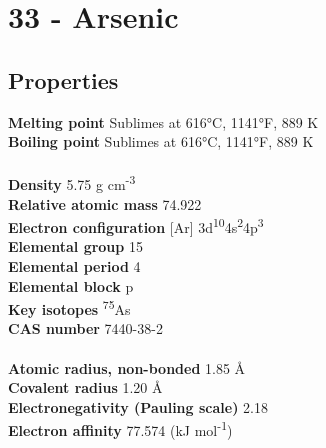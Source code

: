 \section{33 - Arsenic}
\label{sec:elem-arsenic}
\subsection{Properties}
\textbf{Melting point} Sublimes at 616°C, 1141°F, 889 K\\
\textbf{Boiling point} Sublimes at 616°C, 1141°F, 889 K\\
\\
\textbf{Density} 5.75 g cm\textsuperscript{-3}\\
\textbf{Relative atomic mass} 74.922\\
\textbf{Electron configuration} [Ar] 3d\textsuperscript{10}4s\textsuperscript{2}4p\textsuperscript{3}\\
\textbf{Elemental group} 15\\
\textbf{Elemental period} 4\\
\textbf{Elemental block} p\\
\textbf{Key isotopes} \textsuperscript{75}As\\
\textbf{CAS number} 7440-38-2\\
\\
\textbf{Atomic radius, non-bonded} 1.85 Å\\
\textbf{Covalent radius} 1.20 Å\\
\textbf{Electronegativity (Pauling scale)} 2.18\\
\textbf{Electron affinity} 77.574 (kJ mol\textsuperscript{-1})\\